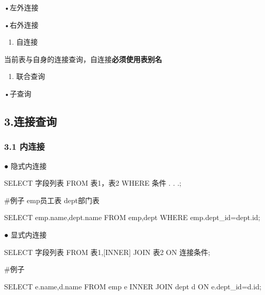 \documentclass[
  letterpaper,
  DIV=11,
  numbers=noendperiod]{scrreprt}
\newenvironment{Shaded}{\begin{snugshade}}{\end{snugshade}}
\newcommand{\KeywordTok}[1]{\textcolor[rgb]{0.00,0.23,0.31}{#1}}
\newcommand{\NormalTok}[1]{\textcolor[rgb]{0.00,0.23,0.31}{#1}}
\newcommand{\OperatorTok}[1]{\textcolor[rgb]{0.37,0.37,0.37}{#1}}
\providecommand{\tightlist}{%
  \setlength{\itemsep}{0pt}\setlength{\parskip}{0pt}}\usepackage{longtable,booktabs,array}
\begin{document}
\hspace{0pt} •左外连接

\hspace{0pt} •右外连接

\begin{enumerate}
\def\labelenumi{\arabic{enumi}.}
\setcounter{enumi}{2}
\tightlist
\item
  自连接
\end{enumerate}

\hspace{0pt} 当前表与自身的连接查询，自连接\textbf{必须使用表别名}

\begin{enumerate}
\def\labelenumi{\arabic{enumi}.}
\setcounter{enumi}{3}
\tightlist
\item
  联合查询
\end{enumerate}

\hspace{0pt} •子查询

\hypertarget{ux8fdeux63a5ux67e5ux8be2}{%
\subsection{3.连接查询}\label{ux8fdeux63a5ux67e5ux8be2}}

\hypertarget{ux5185ux8fdeux63a5}{%
\subsubsection{\texorpdfstring{\textbf{3.1}
\textbf{内连接}}{3.1 内连接}}\label{ux5185ux8fdeux63a5}}

\hspace{0pt} ● 隐式内连接

\begin{Shaded}
\begin{Highlighting}[]
\KeywordTok{SELECT}\NormalTok{ 字段列表 }\KeywordTok{FROM}\NormalTok{ 表1，表2 }\KeywordTok{WHERE}\NormalTok{ 条件 . . .;}

\NormalTok{\#例子 emp员工表 dept部门表}

\KeywordTok{SELECT}\NormalTok{ emp.name,dept.name }\KeywordTok{FROM}\NormalTok{ emp,dept }\KeywordTok{WHERE}\NormalTok{ emp.dept\_id}\OperatorTok{=}\NormalTok{dept.}\KeywordTok{id}\NormalTok{;}
\end{Highlighting}
\end{Shaded}

\hspace{0pt} ● 显式内连接

\begin{Shaded}
\begin{Highlighting}[]
\KeywordTok{SELECT}\NormalTok{ 字段列表 }\KeywordTok{FROM}\NormalTok{ 表1,[}\KeywordTok{INNER}\NormalTok{] }\KeywordTok{JOIN}\NormalTok{ 表2 }\KeywordTok{ON}\NormalTok{ 连接条件;}

\NormalTok{\#例子}

\KeywordTok{SELECT}\NormalTok{ e.name,d.name }\KeywordTok{FROM}\NormalTok{ emp e }\KeywordTok{INNER} \KeywordTok{JOIN}\NormalTok{ dept d }\KeywordTok{ON}\NormalTok{ e.dept\_id}\OperatorTok{=}\NormalTok{d.}\KeywordTok{id}\NormalTok{;}
\end{Highlighting}
\end{Shaded}
\end{document}
